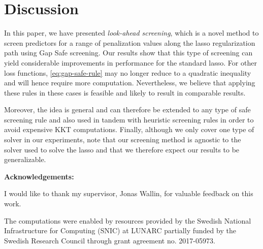 \documentclass[b5paper,10pt,abstractoff,DIV=calc,headings=normal,twoside]{scrartcl}
\newcommand{\acknowledgements}{\par\mbox{}\par\noindent\textbf{Acknowledgements: }}
\theoremstyle{plain}
\theoremstyle{definition}
\theoremstyle{remark}
\begin{document}
\section{Discussion}%
\label{sec:discussion}

In this paper, we have presented \emph{look-ahead screening}, which is a novel
method to screen predictors for a range of penalization values along the lasso
regularization path using Gap Safe screening. Our results show that this type of
screening can yield considerable improvements in performance for the standard
lasso. For other loss functions,
\eqref{eq:gap-safe-rule} may no longer reduce to a quadratic inequality and will
hence require more computation. Nevertheless, we believe
that applying these rules in these cases is feasible and likely to result
in comparable results.

Moreover, the idea is general and can therefore be extended to any type of safe
screening rule and also used in tandem with heuristic screening rules in order
to avoid expensive KKT computations. Finally, although we only cover one type of
solver in our experiments, note that our screening method is
agnostic to the solver used to solve the lasso and that we therefore expect our
results to be generalizable.

\acknowledgements{
  I would like to thank my supervisor, Jonas Wallin, for valuable feedback
  on this work.

  The computations were enabled by resources provided by the Swedish
  National Infrastructure for Computing (SNIC) at LUNARC partially funded
  by the Swedish Research Council through grant agreement no. 2017-05973.
}


\end{document}

